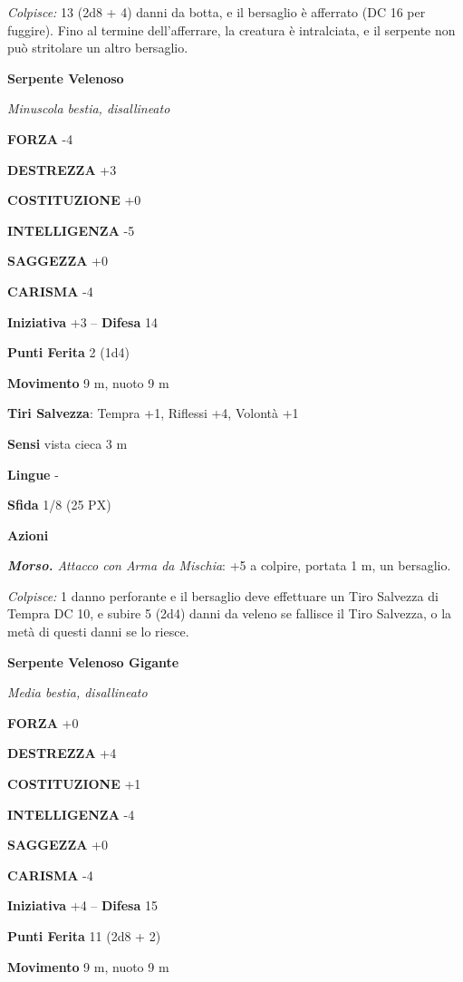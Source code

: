 \begin{multicols}{2}
\textit{Colpisce:} 13 (2d8 + 4) danni da botta, e il bersaglio è afferrato (DC 16 per fuggire). Fino al termine dell'afferrare, la creatura è intralciata, e il serpente non può stritolare un altro bersaglio.

\medskip\textbf{Serpente Velenoso}

\textit{Minuscola bestia, disallineato}

\textbf{FORZA} -4

\textbf{DESTREZZA} +3

\textbf{COSTITUZIONE} +0

\textbf{INTELLIGENZA} -5

\textbf{SAGGEZZA} +0

\textbf{CARISMA} -4

\textbf{Iniziativa} +3 -- \textbf{Difesa} 14

\textbf{Punti Ferita} 2 (1d4)

\textbf{Movimento} 9 m, nuoto 9 m

\textbf{Tiri Salvezza}: Tempra +1, Riflessi +4, Volontà +1

\textbf{Sensi} vista cieca 3 m

\textbf{Lingue} -

\textbf{Sfida} 1/8 (25 PX)

\textbf{Azioni}

\textit{\textbf{Morso.} Attacco con Arma da Mischia}: +5 a colpire, portata 1 m, un bersaglio.

\textit{Colpisce:} 1 danno perforante e il bersaglio deve effettuare un Tiro Salvezza di Tempra DC 10, e subire 5 (2d4) danni da veleno se fallisce il Tiro Salvezza, o la metà di questi danni se lo riesce.

\medskip\textbf{Serpente Velenoso Gigante}

\textit{Media bestia, disallineato}

\textbf{FORZA} +0

\textbf{DESTREZZA} +4

\textbf{COSTITUZIONE} +1

\textbf{INTELLIGENZA} -4

\textbf{SAGGEZZA} +0

\textbf{CARISMA} -4

\textbf{Iniziativa} +4 -- \textbf{Difesa} 15

\textbf{Punti Ferita} 11 (2d8 + 2)

\textbf{Movimento} 9 m, nuoto 9 m


\end{multicols}
